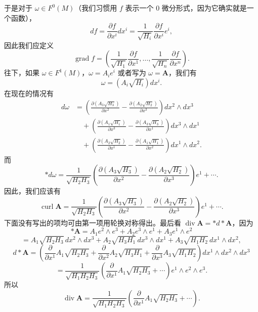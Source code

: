 于是对于 $\omega\in F^0(M)$（我们习惯用 $f$ 表示一个 $0$ 微分形式，因为它确实就是一个函数），
\[
 df=\frac{\partial f}{\partial x^i}dx^i
 =\frac1{\sqrt{H_i}}\frac{\partial f}{\partial x^i}e^i,
\]
因此我们应定义
\begin{equation}
 \operatorname{grad}f=
 \left(\frac1{\sqrt{H_1}}\frac{\partial f}{\partial x^1},\ldots,
 \frac1{\sqrt{H_n}}\frac{\partial f}{\partial x^n}\right).
 \tag{41}
\end{equation}
往下，如果 $\omega\in F^1(M)$，$\omega=A_ie^i$ 或者写为 $\omega=\mathbf A$，我们有
\[
 \omega=(A_i\sqrt{H_i})dx^i.
\]
在现在的情况有
\begin{align*}
 d\omega
 &=\left(\frac{\partial(A_3\sqrt{H_3})}{\partial x^2}-\frac{\partial(A_2\sqrt{H_2})}{\partial x^3}\right)dx^2\wedge dx^3\\
 &\quad+\left(\frac{\partial(A_1\sqrt{H_1})}{\partial x^3}-\frac{\partial(A_3\sqrt{H_3})}{\partial x^1}\right)dx^3\wedge dx^1\\
 &\quad+\left(\frac{\partial(A_2\sqrt{H_2})}{\partial x^1}-\frac{\partial(A_1\sqrt{H_1})}{\partial x^2}\right)dx^1\wedge dx^2.
\end{align*}
而
\begin{equation}
 *d\omega=
 \frac1{\sqrt{H_2H_3}}
 \left(\frac{\partial(A_3\sqrt{H_3})}{\partial x^2}-\frac{\partial(A_2\sqrt{H_2})}{\partial x^3}\right)e^1+\cdots.
 \tag{42}
\end{equation}
因此，我们应该有
\begin{equation}
 \operatorname{curl}\mathbf A=
 \frac1{\sqrt{H_2H_3}}
 \left(\frac{\partial(A_3\sqrt{H_3})}{\partial x^2}-\frac{\partial(A_2\sqrt{H_2})}{\partial x^3}\right)e^1+\cdots.
 \tag{43}
\end{equation}
下面没有写出的项均可由第一项用轮换对称得出。最后看 $\operatorname{div}\mathbf A=*d*\mathbf A$，因为
\[
 *\mathbf A=A_1e^2\wedge e^3+A_2e^3\wedge e^1+A_3e^1\wedge e^2
\]
\[
 =A_1\sqrt{H_2H_3}\,dx^2\wedge dx^3+A_2\sqrt{H_3H_1}\,dx^3\wedge dx^1
 +A_3\sqrt{H_1H_2}\,dx^1\wedge dx^2,
\]
\[
 d*\mathbf A=
 \left(\frac{\partial}{\partial x^1}A_1\sqrt{H_2H_3}
 +\frac{\partial}{\partial x^2}A_2\sqrt{H_3H_1}
 +\frac{\partial}{\partial x^3}A_3\sqrt{H_1H_2}\right)dx^1\wedge dx^2\wedge dx^3
\]
\[
 =\frac1{\sqrt{H_1H_2H_3}}
 \left(\frac{\partial}{\partial x^1}A_1\sqrt{H_2H_3}+\cdots\right)e^1\wedge e^2\wedge e^3.
\]
所以
\begin{equation}
 \operatorname{div}\mathbf A=
 \frac1{\sqrt{H_1H_2H_3}}
 \left(\frac{\partial}{\partial x^1}A_1\sqrt{H_2H_3}+\cdots\right).
 \tag{44}
\end{equation}

